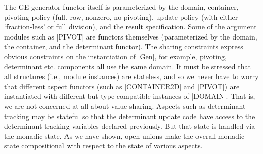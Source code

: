 \documentclass{llncs}
\begin{document}
The GE generator functor itself is 
parameterized by the domain, container, pivoting policy (full, row,
nonzero, no pivoting), update policy (with either `fraction-less'
or full division), and the result specification. Some of the
argument modules such as |PIVOT| are functors themselves (parameterized
by the domain, the container, and the determinant functor). The sharing
constraints express obvious constraints on the instantiation of |Gen|,
for example, pivoting, determinant etc. components all use the same
domain. It must be stressed that all structures (i.e., module
instances) are stateless, and so we never have to worry that different
aspect functors (such as |CONTAINER2D| and |PIVOT|) are instantiated
with different but type-compatible instances of |DOMAIN|. That is, we
are not concerned at all about value sharing. Aspects such as
determinant tracking may be stateful so that the determinant update
code have access to the determinant tracking variables declared
previously. But that state is handled via the monadic state. As we
have shown, open unions make the overall monadic state compositional
with respect to the state of various aspects.
\end{document}
